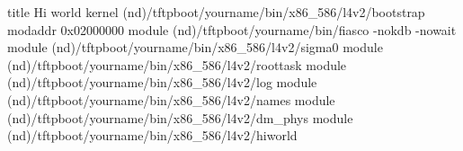 title Hi world
  kernel (nd)/tftpboot/yourname/bin/x86_586/l4v2/bootstrap
  modaddr 0x02000000
  module (nd)/tftpboot/yourname/bin/fiasco -nokdb -nowait
  module (nd)/tftpboot/yourname/bin/x86_586/l4v2/sigma0
  module (nd)/tftpboot/yourname/bin/x86_586/l4v2/roottask
  module (nd)/tftpboot/yourname/bin/x86_586/l4v2/log
  module (nd)/tftpboot/yourname/bin/x86_586/l4v2/names
  module (nd)/tftpboot/yourname/bin/x86_586/l4v2/dm_phys
  module (nd)/tftpboot/yourname/bin/x86_586/l4v2/hiworld
